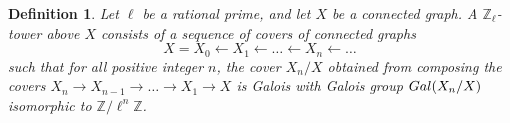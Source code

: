 \documentclass[11pt]{amsart}
\newtheorem{definition}[theorem]{Definition}
\numberwithin{equation}{section}
\theoremstyle{remark}
\begin{document}
\begin{definition} \label{tower}
Let $\ell$ be a rational prime, and let $X$ be a connected graph.  A $\mathbb{Z}_{\ell}$-tower above $X$ consists of a sequence of covers of connected graphs
$$X = X_{0} \leftarrow X_{1} \leftarrow \ldots \leftarrow X_{n} \leftarrow \ldots $$
such that for all positive integer $n$, the cover $X_{n}/X$ obtained from composing the covers $X_{n} \rightarrow X_{n-1} \rightarrow \ldots \rightarrow X_{1} \rightarrow X$ is Galois with Galois group ${\rm Gal}(X_{n}/X)$ isomorphic to $\mathbb{Z}/\ell^{n}\mathbb{Z}$.
\end{definition}

\end{document}
